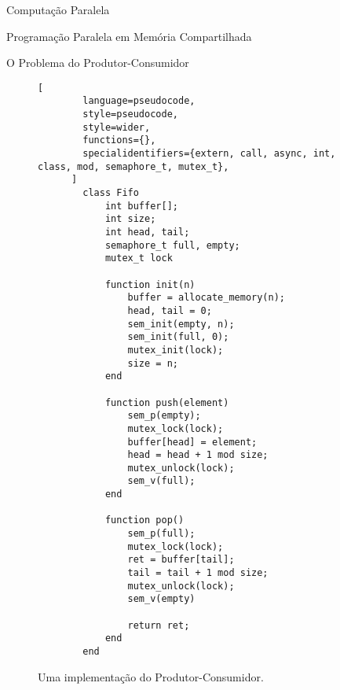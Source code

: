 \begin{section}{Computação Paralela}
\begin{subsection}{Programação Paralela em Memória Compartilhada}
\begin{subsubsection}{O Problema do Produtor-Consumidor}
\begin{figure}
      \begin{lstlisting}[
        language=pseudocode,
        style=pseudocode,
        style=wider,
        functions={},
        specialidentifiers={extern, call, async, int, class, mod, semaphore_t, mutex_t},
      ]
        class Fifo
            int buffer[];
            int size;
            int head, tail;
            semaphore_t full, empty;
            mutex_t lock

            function init(n)
                buffer = allocate_memory(n);
                head, tail = 0;
                sem_init(empty, n);
                sem_init(full, 0);
                mutex_init(lock);
                size = n;
            end

            function push(element)
                sem_p(empty);
                mutex_lock(lock);
                buffer[head] = element;
                head = head + 1 mod size;
                mutex_unlock(lock);
                sem_v(full);
            end

            function pop()
                sem_p(full);
                mutex_lock(lock);
                ret = buffer[tail];
                tail = tail + 1 mod size;
                mutex_unlock(lock);
                sem_v(empty)

                return ret;
            end
        end 

      \end{lstlisting}
      \caption{Uma implementação do Produtor-Consumidor.}
      \label{fig:prod_consumer}
\end{figure}

\end{subsubsection}

\end{subsection}

\end{section}
